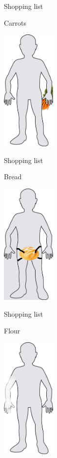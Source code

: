 \begin{frame}{Shopping list}
  \begin{block}{Carrots}
    \begin{center}
      \includegraphics[height=6cm]{img/body/body-03.jpg}
    \end{center}
  \end{block}
\end{frame}

\begin{frame}{Shopping list}
  \begin{block}{Bread}
    \begin{center}
      \includegraphics[height=6cm]{img/body/body-04.jpg}
    \end{center}
  \end{block}
\end{frame}

\begin{frame}{Shopping list}
  \begin{block}{Flour}
    \begin{center}
      \includegraphics[height=6cm]{img/body/body-05.jpg}
    \end{center}
  \end{block}
\end{frame}

